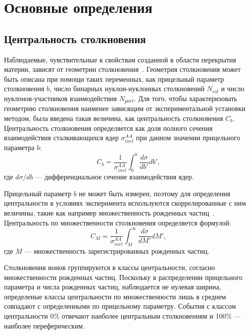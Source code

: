 \section{Основные определения}

\subsection{Центральность столкновения}
\label{theory:centrality}
Наблюдаемые, чувствительные к свойствам созданной в области перекрытия материи, зависят от геометрии столкновения~\cite{ALICE:2010mlf,ALICE:2015juo}.
Геометрия столкновения может быть описана при помощи таких переменных, как прицельный параметр столкновения $b$, число бинарных нуклон-нуклонных столкновений $N_{col}$ и число нуклонов-участников взаимодействия $N_{part}$.
Для того, чтобы характеризовать геометрию столкновения наименее зависящим от экспериментальной установки методом, была введена такая величина, как центральность столкновения $C_b$.
Центральность столкновения определяется как доля полного сечения взаимодействия сталкивающихся ядер $\sigma_{inel}^{AA}$ при данном значении прицельного параметра $b$:
\begin{equation}
    C_b = \frac{1}{\sigma_{inel}^{AA}} \int_{0}^{b} \frac{d\sigma}{db'}db',
\end{equation}
где $d\sigma/db$ --- дифференциальное сечение взаимодействия ядер.

Прицельный параметр $b$ не может быть измерен, поэтому для определения центральности в условиях эксперимента используются скоррелированные с ним величины, такие как например множественность рожденных частиц~\cite{Segal:2020ftt,HADES:2017def}.
Центральность по множественности столкновения определяется формулой:
\begin{equation}
    C_M = \frac{1}{\sigma_{inel}^{AA}} \int_{M}^{\infty} \frac{d\sigma}{dM'}dM',
\end{equation}
где $M$ --- множественность зарегистрированных рожденных частиц.

Столкновения ионов группируются в классы центральности, согласно множественности рожденных частиц.
Поскольку в распределении прицельного параметра и числа рожденных частиц, наблюдается не нулевая ширина, определеные классы центральности по множественности лишь в среднем совпадают с определенными по прицельному параметру.
События с классом центральности 0\% отвечают наиболее центральным столкновениям и 100\% --- наиболее переферическим.

